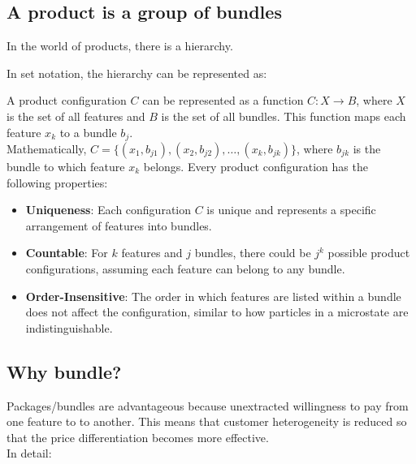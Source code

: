 \documentclass{article}
\begin{document}
\subsection{A product is a group of bundles}

In the world of products, there is a hierarchy.

In set notation, the hierarchy can be represented as:




A product configuration \( C \) can be represented as a function \( C: X \rightarrow B \), where \( X \) is the set of all features and \( B \) is the set of all bundles. This function maps each feature \( x_k \) to a bundle \( b_j \). \\

Mathematically, \( C = \{ (x_1, b_{j1}), (x_2, b_{j2}), \ldots, (x_k, b_{jk}) \} \), where \( b_{jk} \) is the bundle to which feature \( x_k \) belongs. Every product configuration has the following properties: \\

\begin{itemize}
  \item \textbf{Uniqueness}: Each configuration \( C \) is unique and represents a specific arrangement of features into bundles.
  \item \textbf{Countable}: For \( k \) features and \( j \) bundles, there could be \( j^k \) possible product configurations, assuming each feature can belong to any bundle.
  \item \textbf{Order-Insensitive}: The order in which features are listed within a bundle does not affect the configuration, similar to how particles in a microstate are indistinguishable.
\end{itemize}

 
\subsection{Why bundle?}
 
 Packages/bundles are advantageous because unextracted willingness to pay from one feature to to another. This means that customer heterogeneity is reduced so that the price differentiation becomes more effective. \\

 In detail:
\end{document}
